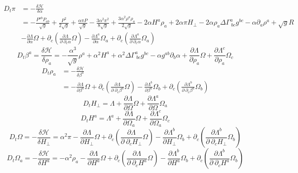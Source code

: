 \documentclass{article}
\begin{document}
\begin{align*}
D_{t} \pi & = -\frac{\delta \mathscr{H}}{\delta \alpha}\\
& = - \frac{P^{ab}P_{ab}}{\sqrt{g}} + \frac{P^{2}}{2\sqrt{g}} + \frac{\alpha \pi P}{\sqrt{g}} - \frac{3\alpha^{2}\pi^{2}}{8\sqrt{g}} + \frac{3\alpha^{2}\rho^{a}\rho_{a}}{2\sqrt{g}}- 2\alpha H^{a}\rho_{a} + 2\alpha \pi H_{\perp} - 2\alpha\rho_{a}\Delta \Gamma^{a}_{~bc}g^{bc} - \alpha \partial_{a}\rho^{a} + \sqrt{g}R\\
& - \frac{\partial \Lambda}{\partial \alpha}\Omega + \partial_{c}\left(\frac{\partial \Lambda}{\partial~\partial_{c}\alpha}\Omega\right) - \frac{\partial \Lambda^{a}}{\partial \alpha}\Omega_{a} + \partial_{c}\left(\frac{\partial \Lambda^{a}}{\partial~\partial_{c}\alpha}\Omega_{a}\right)
\end{align*}
\[
D_{t}\beta^{a} = \frac{\delta \mathscr{H}}{\delta \rho_{a}} = -\frac{\alpha^{3}}{\sqrt{g}}\rho^{a} + \alpha^{2}H^{a} + \alpha^{2}\Delta \Gamma^{a}_{~bc}g^{bc} - \alpha g^{ab}\partial_{b}\alpha + \frac{\partial \Lambda}{\partial \rho_{a}}\Omega + \frac{\partial \Lambda^{c}}{\partial \rho_{a}}\Omega_{c}
\]
\begin{align*}
D_{t}\rho_{a} & = -\frac{\delta \mathscr{H}}{\delta \beta^{a}}\\
& =  - \frac{\partial \Lambda}{\partial \beta^{a}}\Omega + \partial_{c}\left(\frac{\partial \Lambda}{\partial~\partial_{c}\beta^{a}}\Omega\right) - \frac{\partial \Lambda^{b}}{\partial \beta^{a}}\Omega_{b} + \partial_{c}\left(\frac{\partial \Lambda^{b}}{\partial~\partial_{c}\beta^{a}}\Omega_{b}\right)
\end{align*}
\[
D_{t} H_{\perp} = \Lambda + \frac{\partial \Lambda}{\partial \Omega}\Omega + \frac{\partial \Lambda^{a}}{\partial \Omega}\Omega_{a}
\]
\[
D_{t} H^{a} = \Lambda^{a} + \frac{\partial \Lambda}{\partial \Omega_{a}}\Omega + \frac{\partial \Lambda^{c}}{\partial \Omega_{a}}\Omega_{c}
\]
\[
D_{t} \Omega = -\frac{\delta \mathscr{H}}{\delta H_{\perp}} = \alpha^{2}\pi - \frac{\partial \Lambda}{\partial H_{\perp}}\Omega + \partial_{c}\left(\frac{\partial \Lambda}{\partial~\partial_{c}H_{\perp}}\Omega\right) - \frac{\partial \Lambda^{b}}{\partial H_{\perp}}\Omega_{b} + \partial_{c}\left(\frac{\partial \Lambda^{b}}{\partial~\partial_{c}H_{\perp}}\Omega_{b}\right)
\]
\[
D_{t} \Omega_{a} = -\frac{\delta \mathscr{H}}{\delta H^{a}} = -\alpha^{2}\rho_{a} - \frac{\partial \Lambda}{\partial H^{a}}\Omega + \partial_{c}\left(\frac{\partial \Lambda}{\partial~\partial_{c}H^{a}}\Omega\right) - \frac{\partial \Lambda^{b}}{\partial H^{a}}\Omega_{b} + \partial_{c}\left(\frac{\partial \Lambda^{b}}{\partial~\partial_{c}H^{a}}\Omega_{b}\right)
\]
\end{document}
